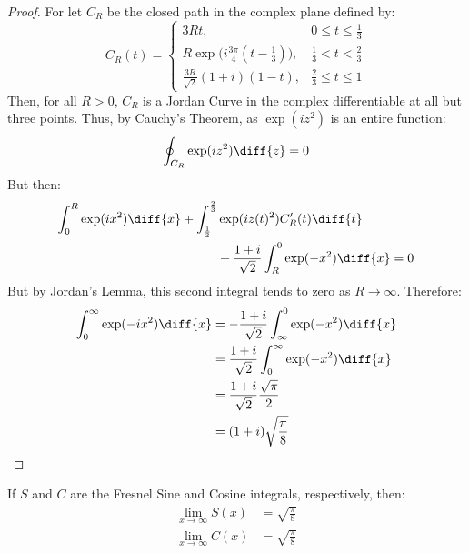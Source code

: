         \begin{proof}
            For let $C_{R}$ be the closed path in the complex plane
            defined by:
            \begin{equation}
                C_{R}(t)=
                \begin{cases}
                    3Rt,&0\leq{t}\leq\frac{1}{3}\\
                    R\exp\big(i\frac{3\pi}{4}(t-\frac{1}{3})\big),
                    &\frac{1}{3}<t<\frac{2}{3}\\
                    \frac{3R}{\sqrt{2}}(1+i)(1-t),
                    &\frac{2}{3}\leq{t}\leq{1}
                \end{cases}
            \end{equation}
            Then, for all $R>0$, $C_{R}$ is a Jordan Curve in the
            complex differentiable at all but three points. Thus,
            by Cauchy's Theorem, as $\exp(iz^{2})$ is an entire
            function:
            \begin{equation}
                \oint_{C_{R}}\exp(iz^{2})\diff{z}
                =0
            \end{equation}
            But then:
            \begin{equation}
                \begin{split}
                    \int_{0}^{R}\exp(ix^{2})\diff{x}+
                    \int_{\frac{1}{3}}^{\frac{2}{3}}&
                        \exp(iz(t)^{2})C_{R}'(t)\diff{t}\\
                    &+\frac{1+i}{\sqrt{2}}\int_{R}^{0}\exp(-x^{2})\diff{x}
                    =0
                \end{split}
            \end{equation}
            But by Jordan's Lemma, this second integral tends to zero as
            $R\rightarrow\infty$. Therefore:
            \begin{align}
                \int_{0}^{\infty}\exp(-ix^{2})\diff{x}
                &=-\frac{1+i}{\sqrt{2}}\int_{\infty}^{0}\exp(-x^{2})\diff{x}\\
                &=\frac{1+i}{\sqrt{2}}\int_{0}^{\infty}\exp(-x^{2})\diff{x}\\
                &=\frac{1+i}{\sqrt{2}}\frac{\sqrt{\pi}}{2}\\
                &=(1+i)\sqrt{\frac{\pi}{8}}
            \end{align}
        \end{proof}
        \begin{theorem}
            If $S$ and $C$ are the Fresnel Sine and Cosine integrals,
            respectively, then:
            \begin{align}
                \underset{x\rightarrow\infty}{\lim}S(x)
                &=\sqrt{\frac{\pi}{8}}\\
                \underset{x\rightarrow\infty}{\lim}C(x)
                &=\sqrt{\frac{\pi}{8}}
            \end{align}
        \end{theorem}
